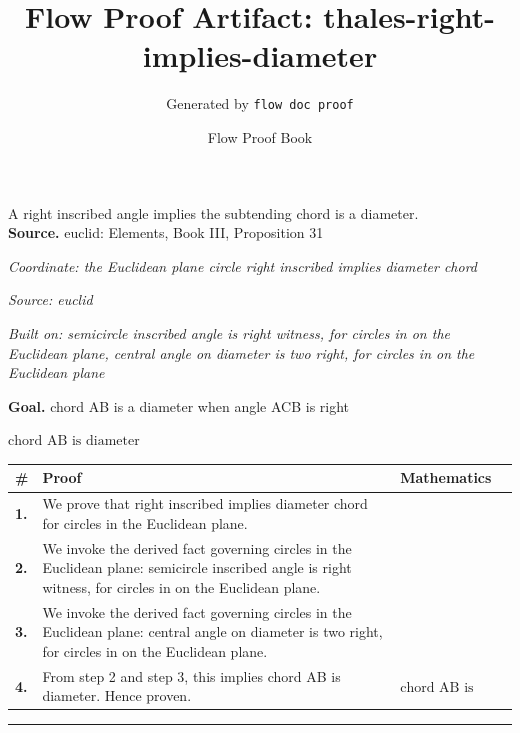 \documentclass[11pt]{article}
\title{Flow Proof Artifact: thales-right-implies-diameter}
\author{Generated by \texttt{flow doc proof}}
\date{Flow Proof Book}
\theoremstyle{definition}
\begin{document}
\maketitle
A right inscribed angle implies the subtending chord is a diameter.\\[0.5em]
\textbf{Source.} euclid: Elements, Book III, Proposition 31\\[0.5em]
\bigskip
{}\par
\smallskip\noindent\textit{Coordinate: the Euclidean plane \cdot circle \cdot right inscribed implies diameter chord}\par
\smallskip\noindent\textit{Source: euclid}\par
\smallskip\noindent\textit{Built on: semicircle inscribed angle is right witness, for circles in on the Euclidean plane, central angle on diameter is two right, for circles in on the Euclidean plane}\par
\medskip
\noindent\textbf{Goal.} chord AB is a diameter when angle ACB is right\par
\noindent$\displaystyle \text{chord AB is diameter}$\par
\medskip
\noindent
\begin{tabular}{@{} >{\raggedright\arraybackslash}p{} >{\raggedright\arraybackslash}p{} >{\raggedleft\arraybackslash}p{} @{}}
\textbf{\#} & \textbf{Proof} & \textbf{Mathematics} \\
\midrule
\textbf{1.} & We prove that right inscribed implies diameter chord for circles in the Euclidean plane. & \\[0.45em]
\textbf{2.} & We invoke the derived fact governing circles in the Euclidean plane: semicircle inscribed angle is right witness, for circles in on the Euclidean plane. & \\[0.45em]
\textbf{3.} & We invoke the derived fact governing circles in the Euclidean plane: central angle on diameter is two right, for circles in on the Euclidean plane. & \\[0.45em]
\textbf{4.} & From step 2 and step 3, this implies chord AB is diameter. Hence proven. & $\displaystyle \text{chord AB is diameter}$ \\[0.45em]
\bottomrule
\end{tabular}
\label{thm:Geometry-circle-right_inscribed_implies_diameter_chord}
\par\medskip\hrule
\end{document}
